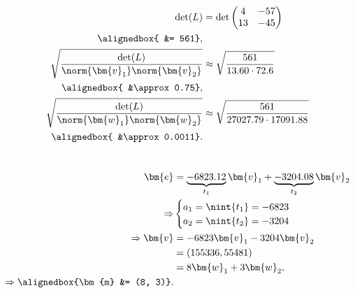 \documentclass[
  coursecode={MTHE 418},
  assignmentname={Homework \homeworknumber},
  studentnumber=20053722,
  name={Bryan Hoang},
  draft,
]{
  ltxanswer%
}
\begin{document}
  \begin{questions}
    \setcounter{question}{\questionnumber}
    \addtocounter{question}{-1}
    \question[10]\
    \begin{parts}
      \part{}
      \begin{solution}
        \begin{align*}
          \det(L)                                                    &= \det\begin{pmatrix}4&-57\\13&-45\end{pmatrix}    \\
          \alignedbox{                                               &= 561},                                            \\
          \sqrt{\frac{\det(L)}{\norm{\bm{v}_{1}} \norm{\bm{v}_{2}}}} &\approx \sqrt{\frac{561}{13.60 \cdot 72.6}}        \\
          \alignedbox{                                               &\approx 0.75},                                     \\
          \sqrt{\frac{\det(L)}{\norm{\bm{w}_{1}} \norm{\bm{w}_{2}}}} &\approx \sqrt{\frac{561}{27027.79 \cdot 17091.88}} \\
          \alignedbox{                                               &\approx 0.0011}.
        \end{align*}
      \end{solution}

      \part{}
      \begin{solution}
        \begin{align*}
          \bm{e}                         &= \underbrace{-6823.12}_{t_{1}} \bm{v}_{1} + \underbrace{-3204.08}_{t_{2}} \bm{v}_{2} \\
          \Rightarrow                    &\begin{cases}
                                            a_{1} = \nint{t_{1}} = -6823 \\
                                            a_{2} = \nint{t_{2}} = -3204
                                          \end{cases}                                  \\
          \Rightarrow \bm{v}             &= -6823 \bm{v}_{1} - 3204 \bm{v}_{2}                                                  \\
                                         &= (155336, 55481)                                                                     \\
                                         &= 8 \bm{w}_{1} + 3 \bm{w}_{2},                                                        \\
          \Rightarrow \alignedbox{\bm{m} &= (8, 3)}.
        \end{align*}
      \end{solution}


\end{parts}
\end{questions}
\end{document}
